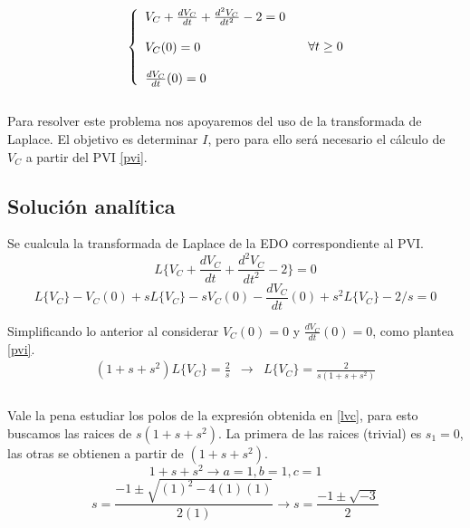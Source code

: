 \documentclass[letterpaper,12pt]{article} %
\begin{document}
\begin{equation}
\left\{ \begin{array}{lcc}
            V_C + \frac{dV_C}{dt} + \frac{d^2V_C}{dt^2}-2=0 &  \\
             \\V_C(0)=0\\
             \\ \frac{dV_C}{dt}(0)=0
             \end{array}\\
   \right. \forall  t\geq 0
\label{pvi}
\end{equation}\\

Para resolver este problema nos apoyaremos del uso de la transformada de Laplace. El objetivo es determinar $I$, pero para ello será necesario el cálculo de $V_C$ a partir del PVI \eqref{pvi}.
\subsection*{Solución analítica}

Se cualcula la transformada de Laplace de la EDO correspondiente al PVI.
\begin{equation*}
L\{V_C + \frac{dV_C}{dt} + \frac{d^2V_C}{dt^2}-2\}=0
\end{equation*}
\begin{equation*}
L\{V_C\}-V_C(0)+sL\{V_C\}-sV_C(0)-\frac{dV_C}{dt}(0)+s^2L\{V_C\}-2/s=0
\end{equation*}


Simplificando lo anterior al considerar $V_C(0)=0$ y $\frac{dV_C}{dt}(0)=0$, como plantea \eqref{pvi}.
\begin{equation}
\begin{array}{lcc}
(1+s+s^2)L\{ V_C \}=\frac{2}{s} & \longrightarrow & L\{V_C\}=\frac{2}{s(1+s+s^2)}\\
\end{array}
\label{lvc}
\end{equation}
\\ 

Vale la pena estudiar los polos de la expresión obtenida en \eqref{lvc}, para esto buscamos las raices de $s(1+s+s^2)$. La primera de las raices (trivial) es $s_1=0$, las otras se obtienen a partir de $(1+s+s^2)$.
\begin{equation*}
1+s+s^2 \longrightarrow a=1, b=1,c=1
\end{equation*}
\begin{equation*}
s=\frac{-1\pm\sqrt{(1)^2-4(1)(1)}}{2(1)} \longrightarrow s=\frac{-1\pm\sqrt{-3}}{2}
\end{equation*}
\end{document}
